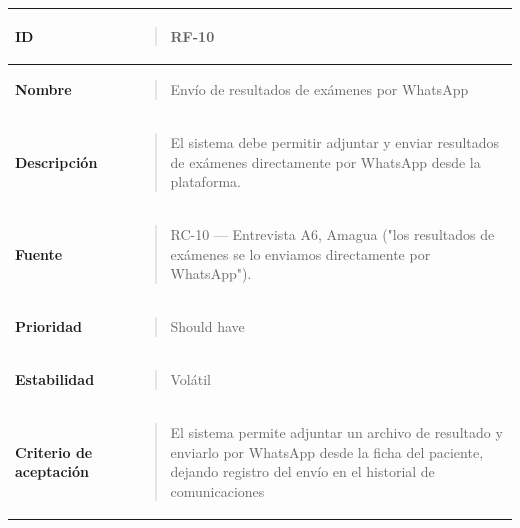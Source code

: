 \documentclass[
]{article}
\newcounter{none} %
\begin{document}
{\def\LTcaptype{none} %
\begin{longtable}[]{@{}
  >{\raggedright\arraybackslash}p{}
  >{\raggedright\arraybackslash}p{}@{}}
\toprule\noalign{}
\begin{minipage}[b]{\linewidth}\raggedright
\textbf{ID}
\end{minipage} & \begin{minipage}[b]{\linewidth}\raggedright
\begin{quote}
RF-10
\end{quote}
\end{minipage} \\
\midrule\noalign{}
\endhead
\bottomrule\noalign{}
\endlastfoot
\textbf{Nombre} & \begin{minipage}[t]{\linewidth}\raggedright
\begin{quote}
Envío de resultados de exámenes por WhatsApp
\end{quote}
\end{minipage} \\
\textbf{Descripción} & \begin{minipage}[t]{\linewidth}\raggedright
\begin{quote}
El sistema debe permitir adjuntar y enviar resultados de exámenes
directamente por WhatsApp desde la plataforma.
\end{quote}
\end{minipage} \\
\textbf{Fuente} & \begin{minipage}[t]{\linewidth}\raggedright
\begin{quote}
RC-10 --- Entrevista A6, Amagua ("los resultados de exámenes se lo
enviamos directamente por WhatsApp").
\end{quote}
\end{minipage} \\
\textbf{Prioridad} & \begin{minipage}[t]{\linewidth}\raggedright
\begin{quote}
Should have
\end{quote}
\end{minipage} \\
\textbf{Estabilidad} & \begin{minipage}[t]{\linewidth}\raggedright
\begin{quote}
Volátil
\end{quote}
\end{minipage} \\
\textbf{Criterio de aceptación} &
\begin{minipage}[t]{\linewidth}\raggedright
\begin{quote}
El sistema permite adjuntar un archivo de resultado y enviarlo por
WhatsApp desde la ficha del paciente, dejando registro del envío en el
historial de comunicaciones


\end{quote}
\end{minipage}
\end{longtable}}
\end{document}

